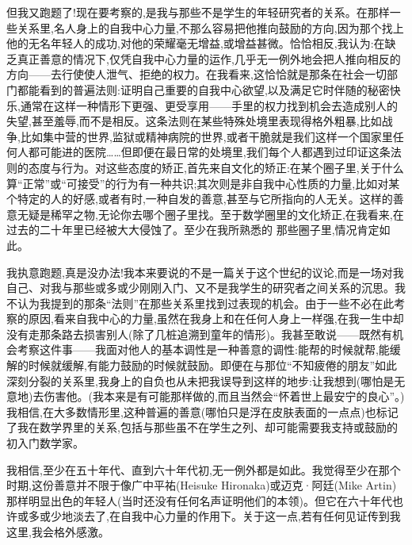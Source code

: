 但我又跑题了!现在要考察的,是我与那些不是学生的年轻研究者的关系。在那样一些关系里,名人身上的自我中心力量,不那么容易把他推向鼓励的方向,因为那个找上他的无名年轻人的成功,对他的荣耀毫无增益,或增益甚微。恰恰相反,我认为:在缺乏真正善意的情况下,仅凭自我中心力量的运作,几乎无一例外地会把人推向相反的方向——去行使使人泄气、拒绝的权力。在我看来,这恰恰就是那条在社会一切部门都能看到的普遍法则:证明自己重要的自我中心欲望,以及满足它时伴随的秘密快乐,通常在这样一种情形下更强、更受享用——手里的权力找到机会去造成别人的失望,甚至羞辱,而不是相反。这条法则在某些特殊处境里表现得格外粗暴,比如战争,比如集中营的世界,监狱或精神病院的世界,或者干脆就是我们这样一个国家里任何人都可能进的医院……但即便在最日常的处境里,我们每个人都遇到过印证这条法则的态度与行为。对这些态度的矫正,首先来自文化的矫正:在某个圈子里,关于什么算“正常”或“可接受”的行为有一种共识;其次则是非自我中心性质的力量,比如对某个特定的人的好感,或者有时,一种自发的善意,甚至与它所指向的人无关。这样的善意无疑是稀罕之物,无论你去哪个圈子里找。至于数学圈里的文化矫正,在我看来,在过去的二十年里已经被大大侵蚀了。至少在我所熟悉的
 那些圈子里,情况肯定如此。

我执意跑题,真是没办法!我本来要说的不是一篇关于这个世纪的议论,而是一场对我自己、对我与那些或多或少刚刚入门、又不是我学生的研究者之间关系的沉思。我不认为我提到的那条“法则”在那些关系里找到过表现的机会。由于一些不必在此考察的原因,看来自我中心的力量,虽然在我身上和在任何人身上一样强,在我一生中却没有走那条路去损害别人(除了几桩追溯到童年的情形)。我甚至敢说——既然有机会考察这件事——我面对他人的基本调性是一种善意的调性:能帮的时候就帮,能缓解的时候就缓解,有能力鼓励的时候就鼓励。即便在与那位“不知疲倦的朋友”如此深刻分裂的关系里,我身上的自负也从未把我误导到这样的地步:让我想到(哪怕是无意地)去伤害他。(我本来是有可能那样做的,而且当然会“怀着世上最安宁的良心”。)我相信,在大多数情形里,这种普遍的善意(哪怕只是浮在皮肤表面的一点点)也标记了我在数学界里的关系,包括与那些虽不在学生之列、却可能需要我支持或鼓励的初入门数学家。

我相信,至少在五十年代、直到六十年代初,无一例外都是如此。我觉得至少在那个时期,这份善意并不限于像广中平祐(Heisuke Hironaka)或迈克·阿廷(Mike Artin)那样明显出色的年轻人(当时还没有任何名声证明他们的本领)。但它在六十年代也许或多或少地淡去了,在自我中心力量的作用下。关于这一点,若有任何见证传到我这里,我会格外感激。

